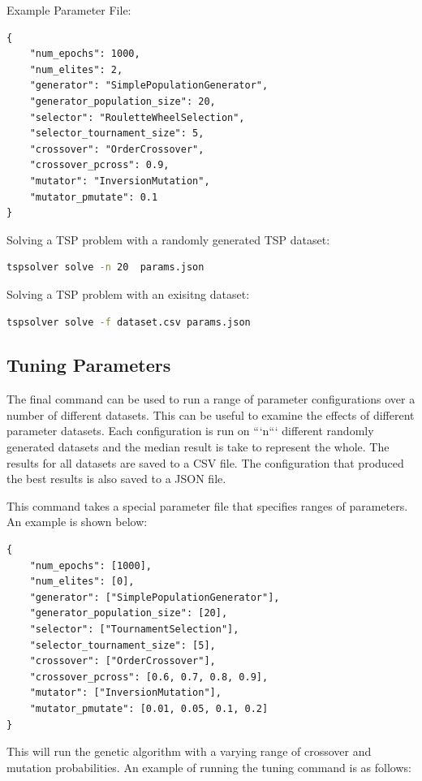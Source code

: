 \documentclass[journal]{IEEEtran}
\begin{document}
Example Parameter File:
\begin{lstlisting}
{
    "num_epochs": 1000,
    "num_elites": 2,
    "generator": "SimplePopulationGenerator",
    "generator_population_size": 20,
    "selector": "RouletteWheelSelection",
    "selector_tournament_size": 5,
    "crossover": "OrderCrossover",
    "crossover_pcross": 0.9,
    "mutator": "InversionMutation",
    "mutator_pmutate": 0.1
}
\end{lstlisting}

Solving a TSP problem with a randomly generated TSP dataset:

\begin{lstlisting}[language=Bash]
tspsolver solve -n 20  params.json
\end{lstlisting}

Solving a TSP problem with an exisitng dataset:
\begin{lstlisting}[language=Bash]
tspsolver solve -f dataset.csv params.json
\end{lstlisting}

\subsection{Tuning Parameters}
The final command can be used to run a range of parameter configurations over a number of different datasets. This can be useful to examine the effects of different parameter datasets. Each configuration is run on ```n``` different randomly generated datasets and the median result is take to represent the whole. The results for all datasets are saved to a CSV file. The configuration that produced the best results is also saved to a JSON file.

This command takes a special parameter file that specifies ranges of parameters. An example is shown below:

\begin{lstlisting}
{
    "num_epochs": [1000],
    "num_elites": [0],
    "generator": ["SimplePopulationGenerator"],
    "generator_population_size": [20],
    "selector": ["TournamentSelection"],
    "selector_tournament_size": [5],
    "crossover": ["OrderCrossover"],
    "crossover_pcross": [0.6, 0.7, 0.8, 0.9],
    "mutator": ["InversionMutation"],
    "mutator_pmutate": [0.01, 0.05, 0.1, 0.2]
}
\end{lstlisting}

This will run the genetic algorithm with a varying range of crossover and mutation probabilities. An example of running the tuning command is as follows:
\end{document}
